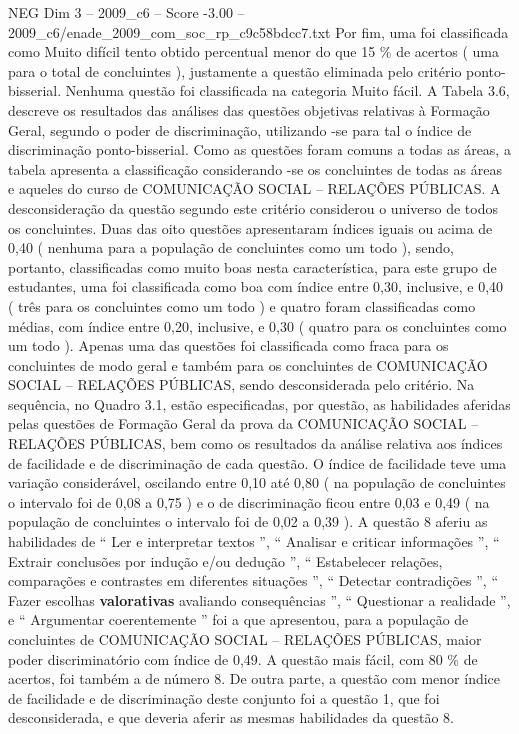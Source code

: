 \begin{textsample}{NEG Dim 3 – 2009\_c6 – Score -3.00 – 2009\_c6/enade\_2009\_com\_soc\_rp\_c9c58bdcc7.txt}
Por fim, uma foi classificada como Muito difícil tento obtido percentual menor do que 15 \% de acertos ( uma para o total de concluintes ), justamente a questão eliminada pelo critério ponto-bisserial.
Nenhuma questão foi classificada na categoria Muito fácil.
A Tabela 3.6, descreve os resultados das análises das questões objetivas relativas à Formação Geral, segundo o poder de discriminação, utilizando -se para tal o índice de discriminação ponto-bisserial.
Como as questões foram comuns a todas as áreas, a tabela apresenta a classificação considerando -se os concluintes de todas as áreas e aqueles do curso de COMUNICAÇÃO SOCIAL – RELAÇÕES PÚBLICAS.
A desconsideração da questão segundo este critério considerou o universo de todos os concluintes.
Duas das oito questões apresentaram índices iguais ou acima de 0,40 ( nenhuma para a população de concluintes como um todo ), sendo, portanto, classificadas como muito boas nesta característica, para este grupo de estudantes, uma foi classificada como boa com índice entre 0,30, inclusive, e 0,40 ( três para os concluintes como um todo ) e quatro foram classificadas como médias, com índice entre 0,20, inclusive, e 0,30 ( quatro para os concluintes como um todo ).
Apenas uma das questões foi classificada como fraca para os concluintes de modo geral e também para os concluintes de COMUNICAÇÃO SOCIAL – RELAÇÕES PÚBLICAS, sendo desconsiderada pelo critério.
Na sequência, no Quadro 3.1, estão especificadas, por questão, as habilidades aferidas pelas questões de Formação Geral da prova da COMUNICAÇÃO SOCIAL – RELAÇÕES PÚBLICAS, bem como os resultados da análise relativa aos índices de facilidade e de discriminação de cada questão.
O índice de facilidade teve uma variação considerável, oscilando entre 0,10 até 0,80 ( na população de concluintes o intervalo foi de 0,08 a 0,75 ) e o de discriminação ficou entre 0,03 e 0,49 ( na população de concluintes o intervalo foi de 0,02 a 0,39 ).
A questão 8 aferiu as habilidades de “ Ler e interpretar textos ”, “ Analisar e criticar informações ”, “ Extrair conclusões por indução e/ou dedução ”, “ Estabelecer relações, comparações e contrastes em diferentes situações ”, “ Detectar contradições ”, “ Fazer escolhas \textbf{valorativas} avaliando consequências ”, “ Questionar a realidade ”, e “ Argumentar coerentemente ” foi a que apresentou, para a população de concluintes de COMUNICAÇÃO SOCIAL – RELAÇÕES PÚBLICAS, maior poder discriminatório com índice de 0,49.
A questão mais fácil, com 80 \% de acertos, foi também a de número 8.
De outra parte, a questão com menor índice de facilidade e de discriminação deste conjunto foi a questão 1, que foi desconsiderada, e que deveria aferir as mesmas habilidades da questão 8.

\end{textsample}
